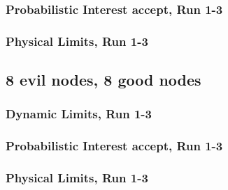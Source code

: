 \documentclass[onecolumn]{IEEEtran}
\begin{document}
\clearpage

\subsubsection{Probabilistic Interest accept, Run 1-3}

\begin{minipage}[b]{\textwidth}

\end{minipage}

\clearpage

\subsubsection{Physical Limits, Run 1-3}

\begin{minipage}[b]{\textwidth}

\end{minipage}

\subsection{\textbf{8 evil nodes}, 8 good nodes}

\subsubsection{Dynamic Limits, Run 1-3}

\begin{minipage}[b]{\textwidth}

\end{minipage}

\clearpage

\subsubsection{Probabilistic Interest accept, Run 1-3}

\begin{minipage}[b]{\textwidth}

\end{minipage}

\clearpage

\subsubsection{Physical Limits, Run 1-3}

\begin{minipage}[b]{\textwidth}

\end{minipage}
\end{document}
